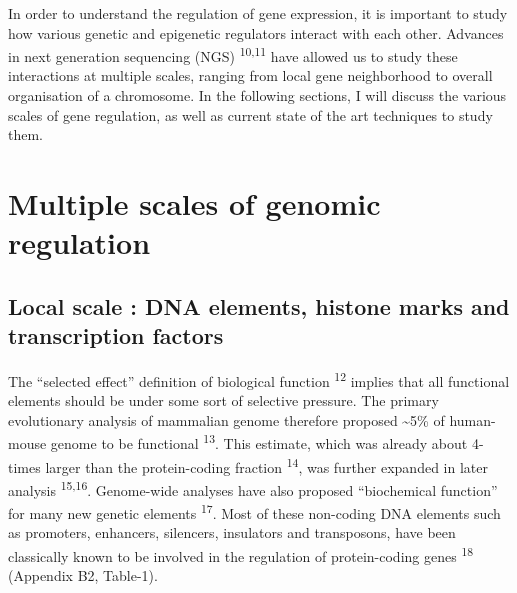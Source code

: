 \documentclass[11pt,twoside]{MPIthesis}
\theoremstyle{definition}
\theoremstyle{definition}
\theoremstyle{definition}
\theoremstyle{remark}
\begin{document}
In order to understand the regulation of gene expression, it is
important to study how various genetic and epigenetic regulators
interact with each other. Advances in next generation sequencing (NGS)
\textsuperscript{10,11} have allowed us to study these interactions at
multiple scales, ranging from local gene neighborhood to overall
organisation of a chromosome. In the following sections, I will discuss
the various scales of gene regulation, as well as current state of the
art techniques to study them.

\section{Multiple scales of genomic
regulation}\label{multiple-scales-of-genomic-regulation}

\subsection{Local scale : DNA elements, histone marks and transcription
factors}\label{local-scale-dna-elements-histone-marks-and-transcription-factors}

The ``selected effect'' definition of biological function
\textsuperscript{12} implies that all functional elements should be
under some sort of selective pressure. The primary evolutionary analysis
of mammalian genome therefore proposed \textasciitilde{}5\% of
human-mouse genome to be functional \textsuperscript{13}. This estimate,
which was already about 4-times larger than the protein-coding fraction
\textsuperscript{14}, was further expanded in later analysis
\textsuperscript{15,16}. Genome-wide analyses have also proposed
``biochemical function'' for many new genetic elements
\textsuperscript{17}. Most of these non-coding DNA elements such as
promoters, enhancers, silencers, insulators and transposons, have been
classically known to be involved in the regulation of protein-coding
genes \textsuperscript{18} (Appendix B2, Table-1).
\end{document}
